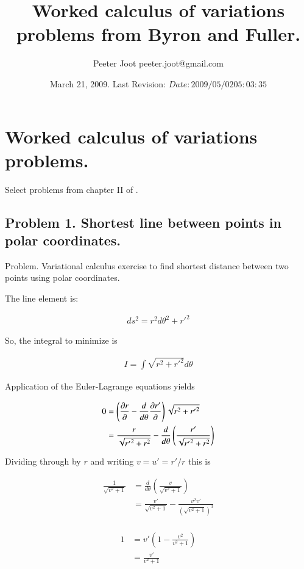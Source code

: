\documentclass{article}
\title{ Worked calculus of variations problems from Byron and Fuller. }
\author{Peeter Joot \quad peeter.joot@gmail.com }
\date{ March 21, 2009.  Last Revision: $Date: 2009/05/02 05:03:35 $ }
\begin{document}
\maketitle{}
\tableofcontents

\section{ Worked calculus of variations problems. }

Select problems from chapter II of \cite{byron1992mca}.

\subsection{ Problem 1.  Shortest line between points in polar coordinates. }

Problem.  Variational calculus exercise to find shortest distance between two points using polar coordinates.
 
The line element is:
 
\begin{align*}
ds^2 = r^2 d\theta^2 + {r'}^2
\end{align*}
 
So, the integral to minimize is
 
\begin{align*}
I = \int \sqrt{ r^2 + {r'}^2 } d\theta
\end{align*}
 
Application of the Euler-Lagrange equations yields
 
\begin{align*}
0 
&= \left( \frac{\partial{r}}{\partial {}} - \frac{d}{d\theta} \frac{\partial{r'}}{\partial {}} \right) \sqrt{ r^2 + {r'}^2 }  \\
&= \frac{r}{\sqrt{{r'}^2 + r^2}} - \frac{d}{d\theta} \left( \frac{{r'}}{\sqrt{{r'}^2 + r^2}}\right) \\
\end{align*}
 
Dividing through by $r$ and writing $v = u' = {r'}/r$ this is
 
\begin{align*}
\frac{1}{\sqrt{v^2 + 1}}
&= \frac{d}{d\theta} \left( \frac{v}{\sqrt{v^2 + 1}}\right) \\
&= \frac{v'}{\sqrt{v^2 + 1}} -\frac{v^2 v'}{(\sqrt{v^2 + 1})^3} \\
\end{align*}
 
\begin{align*}
1 
&= v' \left( 1 -\frac{v^2 }{v^2 + 1} \right) \\
&= \frac{v'}{v^2 + 1} \\
\end{align*}
\end{document}
